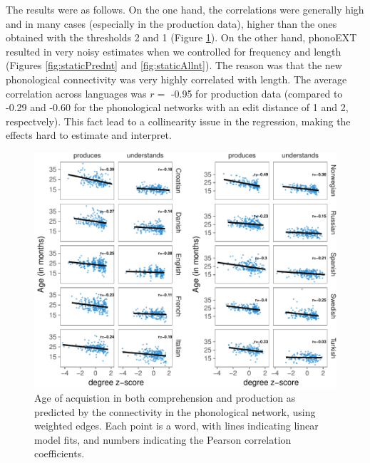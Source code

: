 \documentclass[english,floatsintext,man]{apa6}
\theoremstyle{definition}
\theoremstyle{definition}
\theoremstyle{definition}
\theoremstyle{remark}
\begin{document}
The results were as follows. On the one hand, the correlations were
generally high and in many cases (especially in the production data),
higher than the ones obtained with the thresholds 2 and 1 (Figure
\ref{fig:corrPlotnt}). On the other hand, phonoEXT resulted in very
noisy estimates when we controlled for frequency and length (Figures
\ref{fig:staticPrednt} and \ref{fig:staticAllnt}). The reason was that
the new phonological connectivity was very highly correlated with
length. The average correlation across languages was \(r =\) -0.95 for
production data (compared to -0.29 and -0.60 for the phonological
networks with an edit distance of 1 and 2, respectvely). This fact lead
to a collinearity issue in the regression, making the effects hard to
estimate and interpret.

\begin{figure}[!h]
\includegraphics[width=\textwidth]{ms_files/figure-latex/corrPlotnt-1} \caption{Age of acquistion in both comprehension and production as predicted by the connectivity in the phonological network, using weighted edges. Each point is a word, with lines indicating linear model fits, and numbers indicating the Pearson correlation coefficients.}\label{fig:corrPlotnt}
\end{figure}
\end{document}
